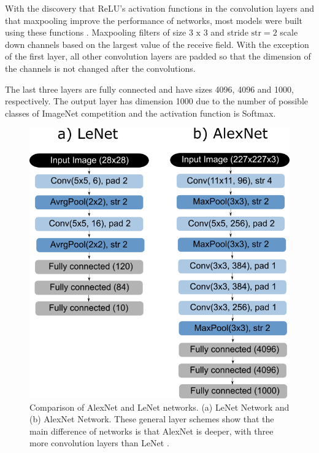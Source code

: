 With the discovery that ReLU's activation functions in the convolution layers and that maxpooling improve the performance of networks, most models were built using these functions \cite{zhang2020dive}. Maxpooling filters of size $3\text{ x }3$ and stride $\text{str} = 2$ scale down channels based on the largest value of the receive field. With the exception of the first layer, all other convolution layers are padded so that the dimension of the channels is not changed after the convolutions.

The last three layers are fully connected and have sizes 4096, 4096 and 1000, respectively. The output layer has dimension 1000 due to the number of possible classes of ImageNet competition and the activation function is Softmax.

\begin{figure}
    \centering
    \includegraphics[scale=0.4]{"Part 3 - Learning Systems/Supervised Learning/Deep Learning/images/figure129.png"}
    \caption{ Comparison of AlexNet and LeNet networks. (a) LeNet Network and (b)  AlexNet Network. These general layer schemes show that the main difference of networks is that AlexNet is deeper, with three more convolution layers than LeNet \cite{zhang2020dive}.}
    \label{fig:lenetalexnet}
\end{figure}


